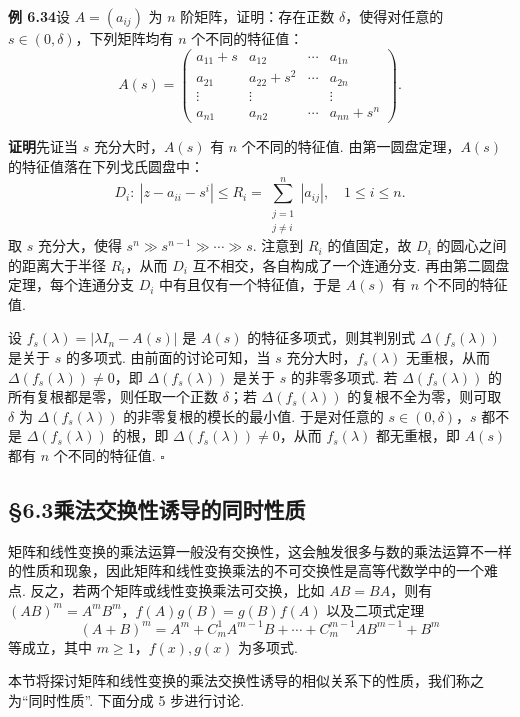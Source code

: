 \documentclass[UTF8, 12pt, fontset=fandol, oneside]{ctexart}
\begin{document}
\noindent\textbf{例 6.34}\quad 设 $A=(a_{ij})$ 为 $n$ 阶矩阵，证明：存在正数 $\delta$，使得对任意的 $s\in(0,\delta)$，下列矩阵均有 $n$ 个不同的特征值：
\[
A(s)=\left(\begin{array}{cccc}
a_{11}+s & a_{12} & \cdots & a_{1n}\\
a_{21} & a_{22}+s^2 & \cdots & a_{2n}\\
\vdots & \vdots & & \vdots\\
a_{n1} & a_{n2} & \cdots & a_{nn}+s^n
\end{array}\right).
\]

\noindent\textbf{证明}\quad 先证当 $s$ 充分大时，$A(s)$ 有 $n$ 个不同的特征值. 由第一圆盘定理，$A(s)$ 的特征值落在下列戈氏圆盘中：
\[
D_i:\ |z-a_{ii}-s^i|\le R_i=\sum_{\substack{j=1\\j\ne i}}^n |a_{ij}|,\quad 1\le i\le n.
\]
取 $s$ 充分大，使得 $s^n\gg s^{n-1}\gg\cdots\gg s$. 注意到 $R_i$ 的值固定，故 $D_i$ 的圆心之间的距离大于半径 $R_i$，从而 $D_i$ 互不相交，各自构成了一个连通分支. 再由第二圆盘定理，每个连通分支 $D_i$ 中有且仅有一个特征值，于是 $A(s)$ 有 $n$ 个不同的特征值.

设 $f_s(\lambda)=|\lambda I_n-A(s)|$ 是 $A(s)$ 的特征多项式，则其判别式 $\Delta(f_s(\lambda))$ 是关于 $s$ 的多项式. 由前面的讨论可知，当 $s$ 充分大时，$f_s(\lambda)$ 无重根，从而 $\Delta(f_s(\lambda))\ne 0$，即 $\Delta(f_s(\lambda))$ 是关于 $s$ 的非零多项式. 若 $\Delta(f_s(\lambda))$ 的所有复根都是零，则任取一个正数 $\delta$；若 $\Delta(f_s(\lambda))$ 的复根不全为零，则可取 $\delta$ 为 $\Delta(f_s(\lambda))$ 的非零复根的模长的最小值. 于是对任意的 $s\in(0,\delta)$，$s$ 都不是 $\Delta(f_s(\lambda))$ 的根，即 $\Delta(f_s(\lambda))\ne 0$，从而 $f_s(\lambda)$ 都无重根，即 $A(s)$ 都有 $n$ 个不同的特征值. $\square$

\subsection*{§6.3\quad 乘法交换性诱导的同时性质}

矩阵和线性变换的乘法运算一般没有交换性，这会触发很多与数的乘法运算不一样的性质和现象，因此矩阵和线性变换乘法的不可交换性是高等代数学中的一个难点. 反之，若两个矩阵或线性变换乘法可交换，比如 $AB=BA$，则有 $(AB)^m=A^mB^m$，$f(A)g(B)=g(B)f(A)$ 以及二项式定理
\[
(A+B)^m=A^m+C_m^1A^{m-1}B+\cdots+C_m^{m-1}AB^{m-1}+B^m
\]
等成立，其中 $m\ge 1$，$f(x),g(x)$ 为多项式.

本节将探讨矩阵和线性变换的乘法交换性诱导的相似关系下的性质，我们称之为“同时性质”. 下面分成 5 步进行讨论.
\end{document}
